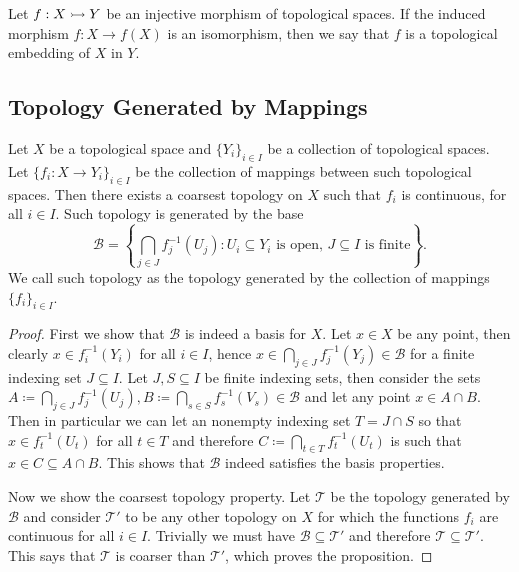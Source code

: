 \begin{definition}[Embedding]\label{def:top-embedding}
Let \(f: X \rightarrowtail Y\) be an injective morphism of topological spaces. If the
induced morphism \(f: X \to f(X)\) is an isomorphism, then we say that \(f\) is a
topological embedding of \(X\) in \(Y\).
\end{definition}

\subsection{Topology Generated by Mappings}

\begin{proposition}
\label{prop: top generated by collection of maps}
Let \(X\) be a topological space and \(\{Y_i\}_{i \in I}\) be a collection of
topological spaces. Let \(\{f_i : X \to Y_i\}_{i \in I}\) be the collection of
mappings between such topological spaces. Then there exists a coarsest
topology on \(X\) such that \(f_i\) is continuous, for all \(i \in I\). Such
topology is generated by the base
\[
  \mathcal B = \left\{ \bigcap_{j \in J} f_j^{-1}(U_j) : U_i \subseteq Y_i
  \text{ is open, } J \subseteq I \text{ is finite}\right\}.
\]
We call such topology as the topology generated by the collection of mappings
\(\{f_i\}_{i \in I}\).
\end{proposition}

\begin{proof}
First we show that \(\mathcal B\) is indeed a basis for \(X\). Let \(x \in X\)
be any point, then clearly \(x \in f_i^{-1}(Y_i)\) for all \(i \in I\), hence
\(x \in \bigcap_{j \in  J} f_j^{-1}(Y_j) \in \mathcal B\) for a finite
indexing set \(J \subseteq I\).
Let \(J, S \subseteq I\) be finite indexing sets, then consider the sets
\(A \coloneq \bigcap_{j \in J} f_j^{-1}(U_j), B \coloneq \bigcap_{s \in S} f_s^{-1}(V_s) \in
\mathcal B\) and let any point \(x \in A \cap B\). Then in particular we can
let an nonempty indexing set \(T = J \cap S\) so that \(x \in f_t^{-1}(U_t)\)
for all \(t \in T\) and therefore \(C \coloneq \bigcap_{t \in  T} f_t^{-1}(U_t)\) is
such that \(x \in C \subseteq A \cap B\). This shows that \(\mathcal B\)
indeed satisfies the basis properties.

Now we show the coarsest topology property. Let \(\mathcal T\) be the topology
generated by \(\mathcal B\) and consider \(\mathcal T'\) to be any other
topology on \(X\) for which the functions \(f_i\) are continuous for all \(i
\in I\). Trivially we must have \(\mathcal B \subseteq \mathcal T'\) and
therefore \(\mathcal T \subseteq \mathcal T'\). This says that \(\mathcal T\)
is coarser than \(\mathcal T'\), which proves the proposition.
\end{proof}

